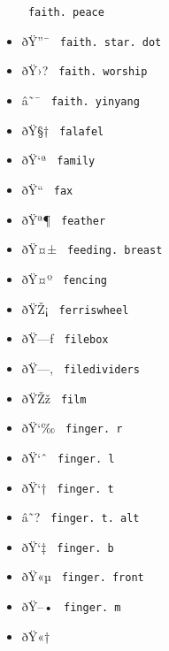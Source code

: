 \begin{itemize}
{  \texttt{\ faith.\ peace\ }}
\item
  \label{symbol-faith.star.dot}{{ ðŸ''¯ }
  \texttt{\ faith.\ star.\ dot\ }}
\item
  \label{symbol-faith.worship}{{ ðŸ›? }
  \texttt{\ faith.\ worship\ }}
\item
  \label{symbol-faith.yinyang}{{ â˜¯ }
  \texttt{\ faith.\ yinyang\ }}
\item
  \label{symbol-falafel}{{ ðŸ§† } \texttt{\ falafel\ }}
\item
  \label{symbol-family}{{ ðŸ`ª } \texttt{\ family\ }}
\item
  \label{symbol-fax}{{ ðŸ`` } \texttt{\ fax\ }}
\item
  \label{symbol-feather}{{ ðŸª¶ } \texttt{\ feather\ }}
\item
  \label{symbol-feeding.breast}{{ ðŸ¤± }
  \texttt{\ feeding.\ breast\ }}
\item
  \label{symbol-fencing}{{ ðŸ¤º } \texttt{\ fencing\ }}
\item
  \label{symbol-ferriswheel}{{ ðŸŽ¡ }
  \texttt{\ ferriswheel\ }}
\item
  \label{symbol-filebox}{{ ðŸ---ƒ } \texttt{\ filebox\ }}
\item
  \label{symbol-filedividers}{{ ðŸ---‚ }
  \texttt{\ filedividers\ }}
\item
  \label{symbol-film}{{ ðŸŽž } \texttt{\ film\ }}
\item
  \label{symbol-finger.r}{{ ðŸ`‰ }
  \texttt{\ finger.\ r\ }}
\item
  \label{symbol-finger.l}{{ ðŸ`ˆ }
  \texttt{\ finger.\ l\ }}
\item
  \label{symbol-finger.t}{{ ðŸ`† }
  \texttt{\ finger.\ t\ }}
\item
  \label{symbol-finger.t.alt}{{ â˜? }
  \texttt{\ finger.\ t.\ alt\ }}
\item
  \label{symbol-finger.b}{{ ðŸ`‡ }
  \texttt{\ finger.\ b\ }}
\item
  \label{symbol-finger.front}{{ ðŸ«µ }
  \texttt{\ finger.\ front\ }}
\item
  \label{symbol-finger.m}{{ ðŸ--• }
  \texttt{\ finger.\ m\ }}
\item
  \label{symbol-fingerprint}{{ ðŸ«† }
}
\end{itemize}
